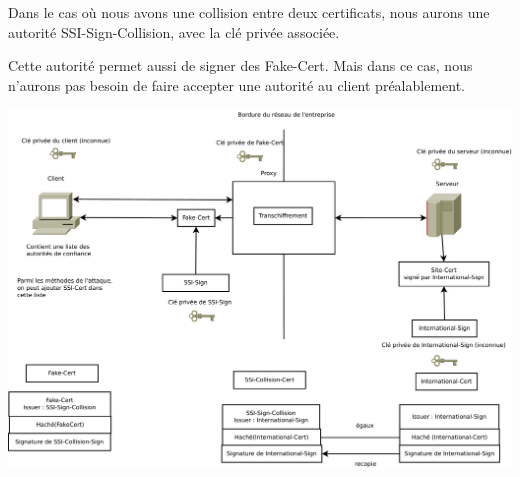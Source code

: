 \documentclass[a4paper,11pt,french]{article}
\begin{document}
Dans le cas où nous avons une collision entre deux certificats, nous aurons une autorité SSI-Sign-Collision, avec la clé privée associée.

Cette autorité permet aussi de signer des Fake-Cert. Mais dans ce cas, nous n'aurons pas besoin de faire accepter une autorité au client préalablement.

\includegraphics[width=\textwidth]{images/schema_autorites.pdf}
\end{document}
